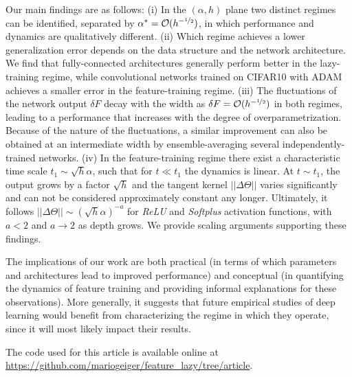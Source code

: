 \documentclass{article}
\newcommand{\abs}[1]{|\!|#1|\!|}
\begin{document}
Our main findings are as follows: (i) In the $(\alpha, h)$ plane two distinct regimes can be identified, separated by $\alpha^* = \mathcal{O}(h^{-\nicefrac12})$, in which performance and dynamics are qualitatively different. 
(ii) Which regime achieves a lower generalization error depends on the data structure and the network architecture. 
We find that fully-connected architectures generally perform better in the lazy-training regime, while convolutional networks trained on CIFAR10 with ADAM achieves a smaller error in the feature-training regime. 
(iii) The fluctuations of the network output $\delta F$ decay with the width as $\delta F = \mathcal{O}(h^{-\nicefrac12})$ in both regimes, leading to a performance that increases with the degree of overparametrization. Because of the nature of the fluctuations, a similar improvement can also be obtained at an intermediate width by ensemble-averaging several independently-trained networks. 
(iv) In the feature-training regime there exist a characteristic time scale $t_1 \sim \sqrt{h}\alpha$, such that for $t \ll t_1$ the dynamics is linear. 
At $t \sim t_1$, the output grows by a factor $\sqrt{h}$ and the tangent kernel $\abs{\Delta \Theta}$ varies significantly and can not be considered approximately constant any longer. Ultimately, it follows $\abs{\Delta \Theta} \sim (\sqrt{h}\alpha)^{-a}$ for \textit{ReLU} and \textit{Softplus} activation functions, with $a < 2$ and $a \to 2$ as depth grows. We provide scaling arguments supporting these findings.

The implications of our work are both practical (in terms of which parameters and architectures lead to improved performance) and conceptual (in quantifying the dynamics of feature training and providing informal explanations for these observations). More generally, it suggests that future empirical studies of deep learning would benefit from characterizing the regime in which they operate, since it will most likely impact their results.

The code used for this article is available online at \url{https://github.com/mariogeiger/feature_lazy/tree/article}.
\end{document}
